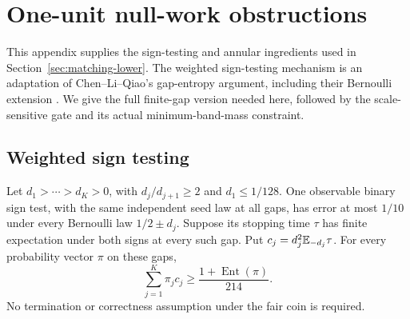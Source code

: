 \section{One-unit null-work obstructions}\label{sec:lower-foundations}

This appendix supplies the sign-testing and annular ingredients used in
Section~\ref{sec:matching-lower}. The weighted sign-testing mechanism is
an adaptation of Chen--Li--Qiao's gap-entropy argument, including their
Bernoulli extension \cite[Lemma 4.1 and Remark D.4]{clq}. We give the full
finite-gap version needed here, followed by the scale-sensitive gate and
its actual minimum-band-mass constraint.

\subsection{Weighted sign testing}

\begin{lemma}\label{lem:weighted-sign}
Let $d_1>\cdots>d_K>0$, with $d_j/d_{j+1}\ge2$ and $d_1\le1/128$.
One observable binary sign test, with the same independent seed law at all
gaps, has error at most $1/10$ under every Bernoulli law $1/2\pm d_j$.
Suppose its stopping time $\tau$ has finite expectation under both signs at
every such gap.  Put $c_j=d_j^2\mathbb E_{-d_j}\tau$.
For every probability vector $\pi$ on these gaps,
\begin{equation}\label{eq:sc-weighted-sign}
 \sum_{j=1}^K\pi_jc_j\ge
 \frac{1+\operatorname{Ent}(\pi)}{214}.
\end{equation}
No termination or correctness assumption under the fair coin is required.
\end{lemma}

